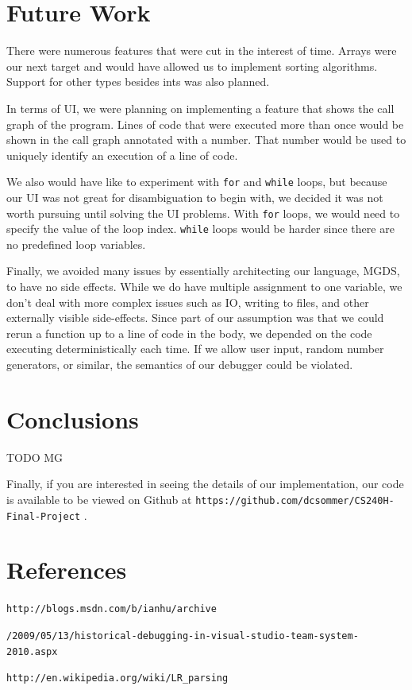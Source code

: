 \documentclass[letterpaper, 10pt]{article}
\newcommand{\ttt}{\texttt}
\begin{document}
\section{Future Work}
There were numerous features that were cut in the interest of time. Arrays
were our next target and would have allowed us to implement sorting
algorithms. Support for other types besides ints was also planned.

In terms of UI, we were planning on implementing a feature that shows the
call graph of the program. Lines of code that were executed more than once
would be shown in the call graph annotated with a number. That number
would be used to uniquely identify an execution of a line of code.

We also would have like to experiment with \ttt{for} and \ttt{while}
loops, but because our UI was not great for disambiguation to begin with,
we decided it was not worth pursuing until solving the UI problems. With
\ttt{for} loops, we would need to specify the value of the loop
index. \ttt{while} loops would be harder since there are no predefined loop
variables. 

Finally, we avoided many issues by essentially architecting our language,
MGDS, to have no side effects. While we do have multiple assignment to one
variable, we don't deal with more complex issues such as IO, writing to
files, and other externally visible side-effects. Since part of our
assumption was that we could rerun a function up to a line of code in the
body, we depended on the code executing deterministically each time. If we
allow user input, random number generators, or similar, the semantics of
our debugger could be violated.

\section{Conclusions}
TODO MG

Finally, if you are interested in seeing the details of our
implementation, our code is available to be viewed on Github at
\ttt{https://github.com/dcsommer/CS240H-Final-Project} .

\section{References}
\begin{enumerate}[{[}1{]}]

\item
\ttt{http://blogs.msdn.com/b/ianhu/archive}

\ttt{/2009/05/13/historical-debugging-in-visual-studio-team-system-2010.aspx}

\item
\ttt{http://en.wikipedia.org/wiki/LR\_parsing}

\end{enumerate}
\end{document}
